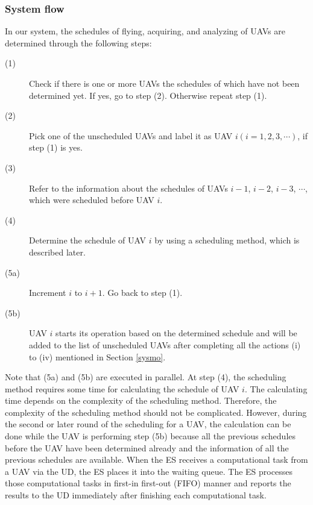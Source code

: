 \documentclass{ieeeaccess}
\begin{document}
\subsubsection{System flow}\label{flow}
In our system, the schedules of flying, acquiring, and analyzing of UAVs are determined through the following steps:
%
\begin{description}
\item[(1)] Check if there is one or more UAVs the schedules of which have not been determined yet. If yes, go to step (2). Otherwise repeat step (1).
\item[(2)] Pick one of the unscheduled UAVs and label it as UAV $i (i=1, 2, 3, \cdots)$, if step (1) is yes.
\item[(3)] Refer to the information about the schedules of UAVs $i-1$, $i-2$, $i-3$, $\cdots$, which were scheduled before UAV $i$.
\item[(4)] Determine the schedule of UAV $i$ by using a scheduling method, which is described later.
\item[(5a)] Increment $i$ to $i+1$. Go back to step (1).
\item[(5b)] UAV $i$ starts its operation based on the determined schedule and will be added to the list of unscheduled UAVs after completing all the actions\hspace{-0.5mm} (i) to (i\hspace{-.1em}v) mentioned in Section \ref{sysmo}.
\end{description}
%
Note that (5a) and (5b) are executed in parallel.
%
At step (4), the scheduling method requires some time for calculating the schedule of UAV $i$.
%
The calculating time depends on the complexity of the scheduling method.
%
Therefore, the complexity of the scheduling method should not be complicated.
%
However, during the second or later round of the scheduling for a UAV, the calculation can be done while the UAV is performing step (5b) because all the previous schedules before the UAV have been determined already and the information of all the previous schedules are available.
%
%
When the ES receives a computational task from a UAV via the UD, the ES places it into the waiting queue. 
The ES processes those computational tasks in first-in first-out (FIFO) manner and reports the results to the UD immediately after finishing each computational task.
\end{document}

